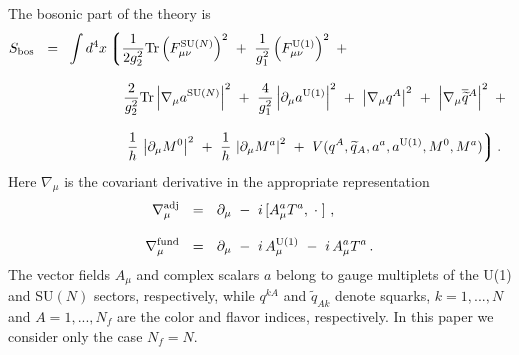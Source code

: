 \documentclass[12pt]{article}
\def\Tr{{\rm Tr}}
\newcommand{\p}{\partial}
\newcommand{\wt}{\widetilde}
\newcommand{\ov}{\overline}
\newcommand{\lgr}{\left\lgroup}
\newcommand{\rgr}{\right\rgroup}
\newcommand{\aU}{a^{\rm U(1)}}
\newcommand{\aN}{a^\text{SU($N$)}}
\begin{document}
\vspace{1mm}

The bosonic part of the theory is
\begin{align}
%
\label{theory}
	S_{\rm bos} ~~=~~ & \int d^4 x 
		\lgr
			\frac{1}{2g_2^2}\Tr \left(F_{\mu\nu}^\text{SU($N$)}\right)^2  ~+~
			\frac{1}{g_1^2} \left(F_{\mu\nu}^{\rm U(1)}\right)^2 ~+~ 
			\right. 
			\\[3mm]
%
\notag
		&
			\phantom{\int d^4 x \lgr\right.\,}
			\frac{2}{g_2^2}\Tr \left|\nabla_\mu \aN \right|^2   ~+~
			\frac{4}{g_1^2} \left|\p_\mu \aU \right|^2
			~+~
			\left| \nabla_\mu q^A \right|^2 ~+~ \left|\nabla_\mu \ov{\wt{q}}{}^A \right|^2 
			~+~
			\\[3mm]
%
\notag
		&
			\phantom{\int d^4 x \lgr\right.\,}
		\left.
			\frac{1}{h}\, \left| \p_\mu M^0 \right|^2  ~+~
			\frac{1}{h}\, \left| \p_\mu M^a \right|^2 ~+~
			V(q^A, \wt{q}{}_A, a^a, \aU, M^0, M^a)
		\rgr .
\end{align}
Here $ \nabla_\mu $ is the covariant derivative in the appropriate representation
\begin{align*}
%
	\nabla_\mu^{\rm adj} & ~~=~~ \p_\mu  ~-~ i\, [ A_\mu^a T^a, \;\cdot\;]~, \\[3mm]
%
	\nabla_\mu^{\rm fund} & ~~=~~ \p_\mu ~-~ i\,A^{\rm U(1)}_\mu ~-~ i\, A_\mu^a T^a\,.
\end{align*}
The vector fields $A_{\mu}$ and complex scalars $a$ belong to gauge multiplets of the U(1) and SU$(N)$ sectors, respectively, while $q^{kA}$ and  $\tilde{q}_{Ak}$ denote squarks, $k=1,...,N$ and $A=1,...,N_f$ are the
color and flavor indices, respectively. In this paper we consider only the case $N_f=N$.


\vspace{1mm}
\end{document}
